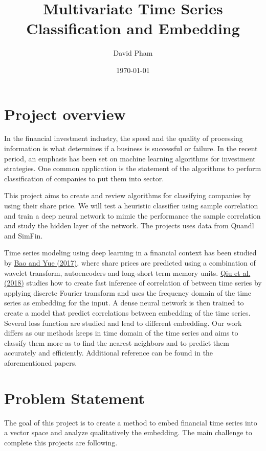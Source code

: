 \documentclass[a4paper,twoside]{article}
\author{David Pham}
\date{\today}
\title{Multivariate Time Series Classification and Embedding}
\begin{document}
\maketitle
\tableofcontents


\section{Project overview}
\label{sec:org59cffe4}

In the financial investment industry, the speed and the quality of processing
information is what determines if a business is successful or failure. In the
recent period, an emphasis has been set on machine learning algorithms for
investment strategies. One common application is the statement of the algorithms
to perform classification of companies to put them into sector.

This project aims to create and review algorithms for classifying companies by
using their share price. We will test a heuristic classifier using sample
correlation and train a deep neural network to mimic the performance the sample
correlation and study the hidden layer of the network. The projects uses data
from Quandl and SimFin.

Time series modeling using deep learning in a financial context has been studied
by \href{https://journals.plos.org/plosone/article?id=10.1371/journal.pone.0180944\#sec009}{Bao and Yue (2017)}, where share prices are predicted using a combination of
wavelet transform, autoencoders and long-short term memory units. \href{https://arxiv.org/pdf/1802.03628.pdf}{Qiu et al.
(2018)} studies how to create fast inference of correlation of between time
series by applying discrete Fourier transform and uses the frequency domain of
the time series as embedding for the input. A dense neural network is then
trained to create a model that predict correlations between embedding of the
time series. Several loss function are studied and lead to different embedding.
Our work differs as our methods keeps in time domain of the time series and aims
to classify them more as to find the nearest neighbors and to predict them
accurately and efficiently. Additional reference can be found in the
aforementioned papers.

\section{Problem Statement}
\label{sec:org46a4ecf}

The goal of this project is to create a method to embed financial time series
into a vector space and analyze qualitatively the embedding. The main
challenge to complete this projects are following.
\end{document}

